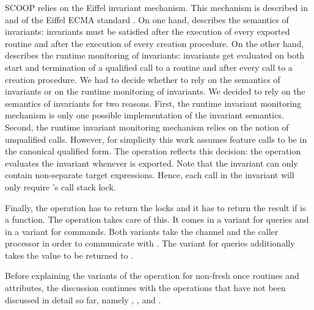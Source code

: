 SCOOP relies on the Eiffel invariant mechanism. This mechanism is described in  and  of the Eiffel ECMA standard \cite{ecma:2006:Eiffel}. On one hand,  describes the semantics of invariants: invariants must be satisfied after the execution of every exported routine and after the execution of every creation procedure. On the other hand,  describes the runtime monitoring of invariants: invariants get evaluated on both start and termination of a qualified call to a routine and after every call to a creation procedure. We had to decide whether to rely on the semantics of invariants or on the runtime monitoring of invariants. We decided to rely on the semantics of invariants for two reasons. First, the runtime invariant monitoring mechanism is only one possible implementation of the invariant semantics. Second, the runtime invariant monitoring mechanism relies on the notion of unqualified calls. However, for simplicity this work assumes feature calls to be in the canonical qualified form. The  operation reflects this decision: the operation evaluates the invariant whenever  is exported. Note that the invariant can only contain non-separate target expressions. Hence, each call in the invariant will only require 's call stack lock.

Finally, the operation has to return the locks and it has to return the result if  is a function. The  operation takes care of this. It comes in a variant for queries and in a variant for commands. Both variants take the channel  and the caller processor  in order to communicate with . The variant for queries additionally takes the value to be returned to .

Before explaining the variants of the  operation for non-fresh once routines and attributes, the discussion continues with the operations that have not been discussed in detail so far, namely , , and .

